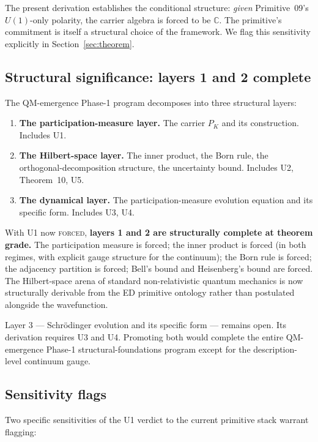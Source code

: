 \documentclass[11pt,a4paper]{article}
\begin{document}
The present derivation establishes the conditional structure: \emph{given} Primitive~09's $U(1)$-only polarity, the carrier algebra is forced to be $\mathbb{C}$. The primitive's commitment is itself a structural choice of the framework. We flag this sensitivity explicitly in Section~\ref{sec:theorem}.

\subsection{Structural significance: layers 1 and 2 complete}

The QM-emergence Phase-1 program decomposes into three structural layers:
\begin{enumerate}
  \item \textbf{The participation-measure layer.} The carrier $P_K$ and its construction. Includes U1.
  \item \textbf{The Hilbert-space layer.} The inner product, the Born rule, the orthogonal-decomposition structure, the uncertainty bound. Includes U2, Theorem~10, U5.
  \item \textbf{The dynamical layer.} The participation-measure evolution equation and its specific form. Includes U3, U4.
\end{enumerate}

With U1 now \textsc{forced}, \textbf{layers 1 and 2 are structurally complete at theorem grade.} The participation measure is forced; the inner product is forced (in both regimes, with explicit gauge structure for the continuum); the Born rule is forced; the adjacency partition is forced; Bell's bound and Heisenberg's bound are forced. The Hilbert-space arena of standard non-relativistic quantum mechanics is now structurally derivable from the ED primitive ontology rather than postulated alongside the wavefunction.

Layer 3 --- Schr\"odinger evolution and its specific form --- remains open. Its derivation requires U3 and U4. Promoting both would complete the entire QM-emergence Phase-1 structural-foundations program except for the description-level continuum gauge.

\subsection{Sensitivity flags}

Two specific sensitivities of the U1 verdict to the current primitive stack warrant flagging:
\end{document}
